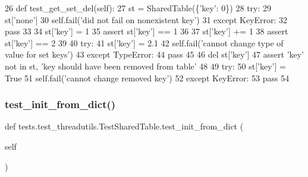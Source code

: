 \begin{DoxyCode}
26     \textcolor{keyword}{def }test\_get\_set\_del(self):
27         st = SharedTable(\{\textcolor{stringliteral}{'key'}: 0\})
28         \textcolor{keywordflow}{try}:
29             st[\textcolor{stringliteral}{'none'}]
30             self.fail(\textcolor{stringliteral}{'did not fail on nonexistent key'})
31         \textcolor{keywordflow}{except} KeyError:
32             \textcolor{keywordflow}{pass}
33 
34         st[\textcolor{stringliteral}{'key'}] = 1
35         \textcolor{keyword}{assert} st[\textcolor{stringliteral}{'key'}] == 1
36 
37         st[\textcolor{stringliteral}{'key'}] += 1
38         \textcolor{keyword}{assert} st[\textcolor{stringliteral}{'key'}] == 2
39 
40         \textcolor{keywordflow}{try}:
41             st[\textcolor{stringliteral}{'key'}] = 2.1
42             self.fail(\textcolor{stringliteral}{'cannot change type of value for set keys'})
43         \textcolor{keywordflow}{except} TypeError:
44             \textcolor{keywordflow}{pass}
45 
46         del st[\textcolor{stringliteral}{'key'}]
47         \textcolor{keyword}{assert} \textcolor{stringliteral}{'key'} \textcolor{keywordflow}{not} \textcolor{keywordflow}{in} st, \textcolor{stringliteral}{'key should have been removed from table'}
48 
49         \textcolor{keywordflow}{try}:
50             st[\textcolor{stringliteral}{'key'}] = \textcolor{keyword}{True}
51             self.fail(\textcolor{stringliteral}{'cannot change removed key'})
52         \textcolor{keywordflow}{except} KeyError:
53             \textcolor{keywordflow}{pass}
54 
\end{DoxyCode}
\mbox{\label{classtests_1_1test__threadutils_1_1TestSharedTable_a877c1284bd99fe9f44c4b744b4bae9d8}} 
\subsubsection{\texorpdfstring{test\+\_\+init\+\_\+from\+\_\+dict()}{test\_init\_from\_dict()}}
{\footnotesize\ttfamily def tests.\+test\+\_\+threadutils.\+Test\+Shared\+Table.\+test\+\_\+init\+\_\+from\+\_\+dict (\begin{DoxyParamCaption}\item[{}]{self }\end{DoxyParamCaption})}



